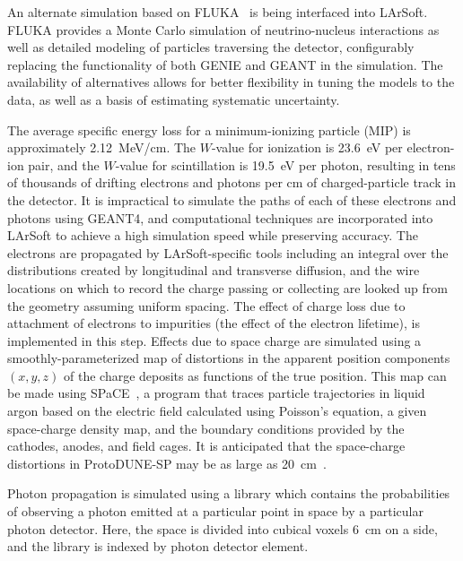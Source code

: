 An alternate simulation based on FLUKA~\cite{Fluka15, Ferrari:2005zk, Battistoni:2009zzb} 
is being interfaced into LArSoft.
FLUKA provides a Monte Carlo simulation of neutrino-nucleus interactions as well as
detailed modeling of particles traversing the detector, configurably replacing the
functionality of both GENIE and GEANT in the simulation.  The availability of alternatives
allows for better flexibility in tuning the models to the data, as well as a basis of
estimating systematic uncertainty.

The average specific energy loss for a minimum-ionizing particle (MIP)
is approximately 2.12~MeV/cm.  The $W$-value for ionization is 23.6~eV
per electron-ion pair, and the $W$-value for scintillation is 19.5~eV
per photon, resulting in tens of thousands of drifting electrons and
photons per cm of charged-particle track in the detector.  It is
impractical to simulate the paths of each of these electrons and
photons using GEANT4, and computational techniques are incorporated
into LArSoft to achieve a high simulation speed while preserving
accuracy.  The electrons are propagated by LArSoft-specific tools
including an integral over the distributions created by longitudinal
and transverse diffusion, and the wire locations on which to record
the charge passing or collecting are looked up from the geometry
assuming uniform spacing.  The effect of charge loss due to attachment
of electrons to impurities (the effect of the electron lifetime), is
implemented in this step.  
Effects due to space charge are simulated using a smoothly-parameterized
map of
distortions in the apparent position components $(x,y,z)$ of the charge
deposits as
functions of the true position.
This map can be made using SPaCE~\cite{Mooney:2015kke}, a
program that traces particle trajectories in liquid argon based on the
electric field calculated using Poisson's equation, a given
space-charge density map, and the boundary conditions provided by the
cathodes, anodes, and field cages.  It is anticipated that the
space-charge distortions in ProtoDUNE-SP may be as large as
20~cm~\cite{Mooney:2015kke}. 


Photon propagation is simulated using a library which contains the
probabilities of observing a photon emitted at a particular point in
space by a particular photon detector.  Here, the space is divided
into cubical voxels 6~cm on a side, and the library is indexed by photon
detector element. 

